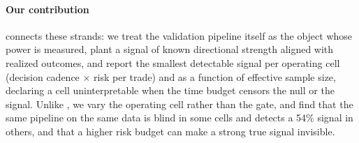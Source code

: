 \paragraph{Our contribution}
connects these strands: we treat the validation pipeline itself as the object whose power is measured, plant a signal of known directional strength aligned with realized outcomes, and report the smallest detectable signal per operating cell (decision cadence $\times$ risk per trade) and as a function of effective sample size, declaring a cell uninterpretable when the time budget censors the null or the signal. Unlike \citet{zheng2026}, we vary the operating cell rather than the gate, and find that the same pipeline on the same data is blind in some cells and detects a 54\% signal in others, and that a higher risk budget can make a strong true signal invisible.

